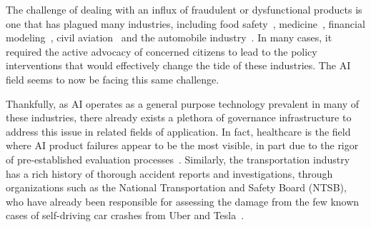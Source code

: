 \documentclass[acmconf,manuscript,screen,natbib=true]{acmart}
\begin{document}
The challenge of dealing with an influx of fraudulent or dysfunctional products is one that has plagued many industries, including food safety~\cite{blum2018poison}, medicine~\cite{anderson2015snake,bausell2009snake}, financial modeling~\cite{silver2012signal}, civil aviation~\cite{heppenheimer1995turbulent} and the automobile industry~\cite{nader1965unsafe,vinsel2019moving}. %
In many cases, it required the active advocacy of concerned citizens %
to lead to the policy interventions that would effectively change the tide of these industries. The AI field seems to now be facing this same challenge. %

Thankfully, as AI operates as a general purpose technology prevalent in many of these industries, there already exists a plethora of governance infrastructure to address this issue in related fields of application. %
In fact, healthcare is the field where AI product failures appear to be the most visible, in part due to the rigor of pre-established evaluation processes~\cite{wu2021medical,liu2020reporting, rivera2020guidelines, benjamens2020state}. %
Similarly, the transportation industry has a rich history of thorough accident reports and investigations, through organizations such as the National Transportation and Safety Board (NTSB), who have already been responsible for assessing the damage from the few known cases of self-driving car crashes from Uber and Tesla~\cite{harris2019ntsb}.
\end{document}
